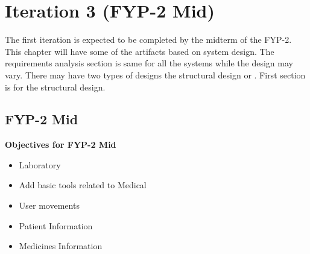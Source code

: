\chapter{Iteration 3 (FYP-2 Mid)}
\label{ch:iter3}

The first iteration is expected to be completed by the midterm of the FYP-2.
This chapter will have some of the artifacts based on system design. The requirements analysis section is same for all the systems while the design may vary. There may have two types of designs the structural design or . First section is for the structural design.


\section{FYP-2 Mid}
\textbf{Objectives for FYP-2 Mid}
	\begin{itemize}
		\item Laboratory
		\item Add basic tools related to Medical 
		\item User movements
		\item Patient Information
		\item Medicines Information 
	\end{itemize}
\newpage
